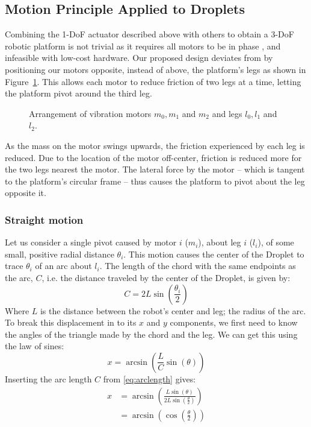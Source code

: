 \documentclass[letterpaper, 10pt, conference]{ieeeconf}
\begin{document}
\subsection{Motion Principle Applied to Droplets}
Combining the 1-DoF actuator described above with others to obtain a 3-DoF robotic platform is not trivial as it requires all motors to be in phase \cite{Vartholomeos2005}, and infeasible with low-cost hardware. Our proposed design deviates from \cite{Vartholomeos2005} by positioning our motors opposite, instead of above, the platform's legs as shown in Figure~\ref{DropletMotorDiagram}. This allows each motor to reduce friction of two legs at a time, letting the platform pivot around the third leg. 


\begin{figure}
\centering

\caption{Arrangement of vibration motors $m_0, m_1$ and $m_2$ and legs $l_0, l_1$ and $l_2$.}
\label{DropletMotorDiagram}
\end{figure}

As the mass on the motor swings upwards, the friction experienced by each leg is reduced. Due to the location of the motor off-center, friction is reduced more for the two legs nearest the motor. The lateral force by the motor -- which is tangent to the platform's circular frame -- thus causes the platform to pivot about the leg opposite it.



\subsubsection{Straight motion}
Let us consider a single pivot caused by motor $i$ ($m_i$), about leg $i$ ($l_i$), of some small, positive radial distance $\theta_i$. This motion causes the center of the Droplet to trace $\theta_i$ of an arc about $l_i$. The length of the chord with the same endpoints as the arc, $C$, i.e. the distance traveled by the center of the Droplet, is given by:
\begin{equation}\label{eq:arclength}
C=2 L \sin\left(\frac{\theta_i}{2}\right)
\end{equation}
Where $L$ is the distance between the robot's center and leg; the radius of the arc. To break this displacement in to its $x$ and $y$ components, we first need to know the angles of the triangle made by the chord and the leg. We can get this using the law of sines:
\begin{equation}
x = \arcsin\left(\frac{L}{C}\sin(\theta)\right) 
\end{equation}
Inserting the arc length $C$ from \ref{eq:arclength} gives:
\begin{align}
x &=\arcsin\left(\frac{L\sin(\theta)}{2 L \sin(\frac{\theta}{2})}\right) \\
\nonumber
   &=\arcsin\left(\cos\left(\frac{\theta}{2}\right)\right)
\end{align}
\end{document}
